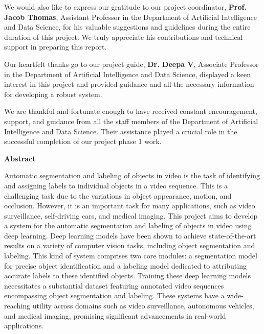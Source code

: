 {\noindent
We would also like to express our gratitude to our project coordinator, \textbf{Prof. Jacob Thomas}, Assistant Professor in the Department of Artificial Intelligence and Data Science, for his valuable suggestions and guidelines during the entire duration of this project. We truly appreciate his contributions and technical support in preparing this report.

\noindent
Our heartfelt thanks go to our project guide, \textbf{Dr. Deepa V}, Associate Professor in the Department of Artificial Intelligence and Data Science, displayed a keen interest in this project and provided guidance and all the necessary information for developing a robust system.

\noindent
We are thankful and fortunate enough to have received constant encouragement, support, and guidance from all the staff members of the Department of Artificial Intelligence and Data Science. Their assistance played a crucial role in the successful completion of our project phase 1 work.  

\newpage
\thispagestyle{empty}
\begin{center}
  \vspace*{1cm}
  \textbf{\large Abstract}
\end{center}
Automatic segmentation and labeling of objects in video is the task of identifying and assigning labels to individual objects in a video sequence. This is a challenging task due to the variations in object appearance, motion, and occlusion. However, it is an important task for many applications, such as video surveillance, self-driving cars, and medical imaging. This project aims to develop a system for the automatic segmentation and labeling of objects in video using deep learning. Deep learning models have been shown to achieve state-of-the-art results on a variety of computer vision tasks, including object segmentation and labeling. This kind of system comprises two core modules: a segmentation model for precise object identification and a labeling model dedicated to attributing accurate labels to these identified objects. Training these deep learning models necessitates a substantial dataset featuring annotated video sequences encompassing object segmentation and labeling. These systems have a wide-reaching utility across domains such as video surveillance, autonomous vehicles, and medical imaging, promising significant advancements in real-world applications.

}

